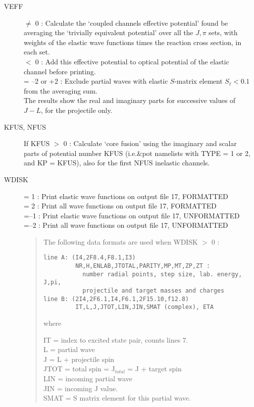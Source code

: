 \documentclass[11pt]{article}
\begin{document}
\begin{description}
\item[VEFF]
  $\neq$ 0 : Calculate the `coupled channels effective potential'
found be averaging the `trivially equivalent potential' over all
the $J,\pi$ sets, with weights of the elastic wave functions
times the reaction cross section, in each set.
\\  $<$  0 : Add this effective potential to optical potential
of the elastic channel before printing.
\\  = --2 or +2 : Exclude partial waves with elastic $S$-matrix element
$S_\ell< 0.1$ from the averaging sum.
\\ The results show the real and imaginary parts for successive
values of $J-L$, for the projectile only.

\item[KFUS, NFUS]
If KFUS  $>$ 0 :  Calculate `core fusion' using the imaginary and scalar
parts of potential number KFUS (i.e.\&pot namelists with TYPE = 1 or 2,
and KP = KFUS), also for the first NFUS inelastic channels.



\item[WDISK]
  = 1 :  Print elastic wave functions on output file 17, FORMATTED
\\  = 2 :  Print   all   wave functions on output file 17, FORMATTED
\\  =--1 :  Print elastic wave functions on output file 17, UNFORMATTED
\\  =--2 :  Print   all   wave functions on output file 17, UNFORMATTED


\begin{quotation}
\noindent
The following data formats are used when WDISK $>$ 0 :
\begin{verbatim}
line A: (I4,2F8.4,F8.1,I3)
         NR,H,ENLAB,JTOTAL,PARITY,MP,MT,ZP,ZT :
           number radial points, step size, lab. energy,  J,pi,
           projectile and target masses and charges
line B: (2I4,2F6.1,I4,F6.1,2F15.10,f12.8)
         IT,L,J,JTOT,LIN,JIN,SMAT (complex), ETA
\end{verbatim}
where

IT = index to excited state pair, counts lines 7.\\
L  = partial wave\\
J  = L + projectile spin\\
JTOT = total spin = J$_{total}$ = J + target spin\\
LIN  = incoming partial wave\\
JIN  = incoming J value.\\
SMAT = S matrix element for this partial wave.\\


\end{quotation}
\end{description}
\end{document}
